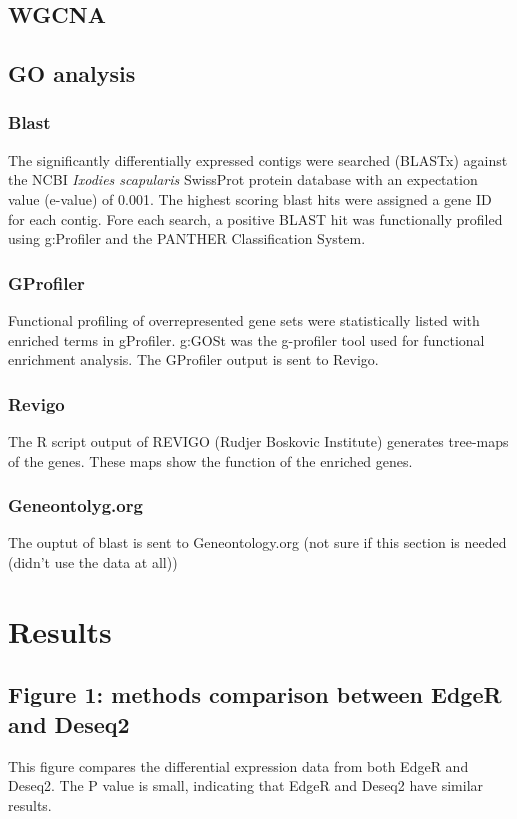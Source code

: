 \documentclass[11pt]{article}
\begin{document}
\subsection{WGCNA}
\label{sec:org8b88d21}
\subsection{GO analysis}
\label{sec:org1492adf}
\subsubsection{Blast}
\label{sec:org67be582}
The significantly differentially expressed contigs were searched (BLASTx) against the NCBI \emph{Ixodies scapularis} SwissProt protein database with an expectation value (e-value) of 0.001.
The highest scoring blast hits were assigned a gene ID for each contig.
Fore each search, a positive BLAST hit was functionally profiled using g:Profiler and the PANTHER Classification System.
\subsubsection{GProfiler}
\label{sec:org7926636}
Functional profiling of overrepresented gene sets were statistically listed with enriched terms in gProfiler.
g:GOSt was the g-profiler tool used for functional enrichment analysis.
The GProfiler output is sent to Revigo.
\subsubsection{Revigo}
\label{sec:org70b0d3f}
The R script output of REVIGO (Rudjer Boskovic Institute) generates tree-maps of the genes. These maps show the function of the enriched genes.
\subsubsection{Geneontolyg.org}
\label{sec:orgd728dbd}
The ouptut of blast is sent to Geneontology.org (not sure if this section is needed (didn't use the data at all))
\section{Results}
\label{sec:orgf8494aa}
\subsection{Figure 1: methods comparison between EdgeR and Deseq2}
\label{sec:org1bf6993}
This figure compares the differential expression data from both EdgeR and Deseq2. The P value is small, indicating that EdgeR and Deseq2 have similar results.
\end{document}
